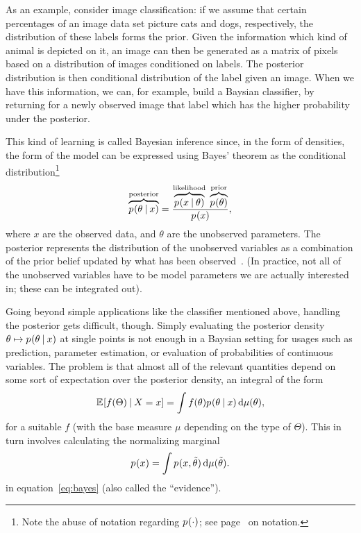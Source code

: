 As an example, consider image classification: if we assume that certain percentages of an image data
set picture cats and dogs, respectively, the distribution of these labels forms the prior.  Given
the information which kind of animal is depicted on it, an image can then be generated as a matrix
of pixels based on a distribution of images conditioned on labels.  The posterior distribution is
then conditional distribution of the label given an image.  When we have this information, we
can, for example, build a Baysian classifier, by returning for a newly observed image that label
which has the higher probability under the posterior.

This kind of learning is called Bayesian inference since, in the form of densities, the form of the
model can be expressed using Bayes' theorem as the conditional distribution\footnote{Note the abuse
  of notation regarding \(\prob{\cdot}\); see page~\pageref{cha:notation} on notation.}
\begin{equation}
  \label{eq:bayes}
  \overbrace{\prob{\theta \given x}}^{\text{posterior}} =
  \frac{\overbrace{\prob{x \given \theta}}^{\text{likelihood}}\;
    \overbrace{\prob{\theta}}^{\text{prior}}}{\prob{x}},
\end{equation}
where \(x\) are the observed data, and \(\theta\) are the unobserved parameters. The posterior
represents the distribution of the unobserved variables as a combination of the prior belief updated
by what has been observed~\parencite{congdon2006bayesian}.  (In practice, not all of the unobserved
variables have to be model parameters we are actually interested in; these can be integrated out).

Going beyond simple applications like the classifier mentioned above, handling the posterior gets
difficult, though.  Simply evaluating the posterior density
\(\theta \mapsto \prob{\theta \given x}\) at single points is not enough in a Baysian setting for
usages such as prediction, parameter estimation, or evaluation of probabilities of continuous
variables.  The problem is that almost all of the relevant quantities depend on some sort of
expectation over the posterior density, an integral of the form
\begin{equation}
  \label{eq:posterior-expectation}
  \Exp{f(\Theta) \given X = x} = \int f(\theta) \prob{\theta \given x} \dif \mu(\theta),
\end{equation}
for a suitable \(f\) (with the base measure \(\mu\) depending on the type of \(\Theta\)). This in
turn involves calculating the normalizing marginal
\begin{equation}
  \label{eq:normalizing}
  \prob{x} = \int \prob{x, \tilde{\theta}} \dif \mu(\tilde{\theta}).
\end{equation}
in equation~\ref{eq:bayes} (also called the \enquote{evidence}).

